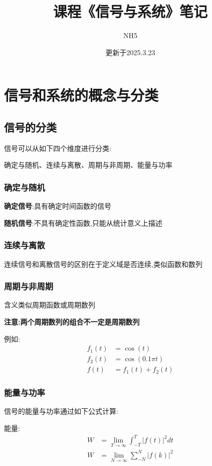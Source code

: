 \documentclass[12pt, a4paper, oneside]{ctexart}
\title{课程《信号与系统》笔记}
\author{NH5}
\date{更新于2025.3.23}
\begin{document}
\maketitle

\section{信号和系统的概念与分类}
\subsection{信号的分类}
信号可以从如下四个维度进行分类:

确定与随机、连续与离散、周期与非周期、能量与功率

\subsubsection{确定与随机}
\textbf{确定信号}:具有确定时间函数的信号

\textbf{随机信号}:不具有确定性函数,只能从统计意义上描述

\subsubsection{连续与离散}
连续信号和离散信号的区别在于定义域是否连续,类似函数和数列

\subsubsection{周期与非周期}
含义类似周期函数或周期数列

\textbf{注意:两个周期数列的组合不一定是周期数列}

例如:
\begin{align*}
    f_1(t) &= \cos (t)\\
    f_2(t) &= \cos (0.1 \pi t)\\
    f(t) &= f_1(t) + f_2(t)
\end{align*}

\subsubsection{能量与功率}
信号的能量与功率通过如下公式计算:

能量:
\begin{align*}
    W &= \lim_{T \to \infty}\int_{-T}^{T} |f(t)|^2 dt\\
    W &= \lim_{N \to \infty}\sum_{-N}^{N}|f(k)|^2
\end{align*}
\end{document}
